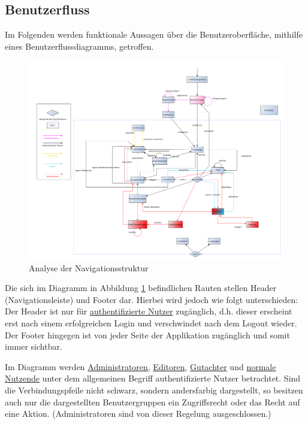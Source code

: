 \subsection{Benutzerfluss}
Im Folgenden werden funktionale Aussagen über die Benutzeroberfläche, mithilfe eines Benutzerflussdiagramms, getroffen.

\begin{figure}[H]
	\centering
	\includegraphics[width=\linewidth]{graphics/benutzerFlussyEd-png}
	\caption{Analyse der Navigationsstruktur}
	\label{fig:benutzerfluss}
\end{figure}

Die sich im Diagramm in Abbildung \ref{fig:benutzerfluss} befindlichen Rauten stellen Header (Navigationsleiste) und Footer dar.
Hierbei wird jedoch wie folgt unterschieden: Der Header ist nur für \hyperref[mkrit:angemeldet]{authentifizierte Nutzer} zugänglich,
d.h. dieser erscheint erst nach einem erfolgreichen Login und verschwindet nach dem Logout wieder.
Der Footer hingegen ist von jeder Seite der Applikation zugänglich und somit immer sichtbar.

Im Diagramm werden \hyperref[mkrit:admin]{Administratoren}, \hyperref[mkrit:editor]{Editoren}, \hyperref[mkrit:gutachter]{Gutachter} und \hyperref[mkrit:angemeldet]{normale Nutzende} unter dem allgemeinen Begriff
authentifizierte Nutzer betrachtet.
Sind die Verbindungspfeile nicht schwarz, sondern andersfarbig dargestellt, so besitzen auch nur die
dargestellten Benutzergruppen ein Zugriffsrecht oder das Recht auf eine Aktion. (Administratoren sind von dieser Regelung
ausgeschlossen.)

